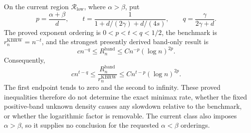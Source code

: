 On the current region \(\mathcal R_{\mathrm{low}}\), where \(\alpha>\beta\), put
\[
p=\frac{\alpha+\beta}{d},\qquad
t=\frac{1}{1+d/(2\gamma)+d/(4s)},\qquad
q=\frac{\gamma}{2\gamma+d}.
\]
The proved exponent ordering is \(0<p<t<q<1/2\), the benchmark is \(r_n^{\mathrm{KBRW}}=n^{-t}\), and the strongest presently derived band-only result is
\[
cn^{-q}\le R_n^{\mathrm{band}}
\le Cn^{-p}(\log n)^{2p}.
\]
Consequently,
\[
cn^{t-q}\le
\frac{R_n^{\mathrm{band}}}{r_n^{\mathrm{KBRW}}}
\le Cn^{t-p}(\log n)^{2p}.
\]
The first endpoint tends to zero and the second to infinity.  These proved inequalities therefore do not determine the exact minimax rate, whether the fixed positive-band unknown density causes any slowdown relative to the benchmark, or whether the logarithmic factor is removable.  The current class also imposes \(\alpha>\beta\), so it supplies no conclusion for the requested \(\alpha<\beta\) orderings.